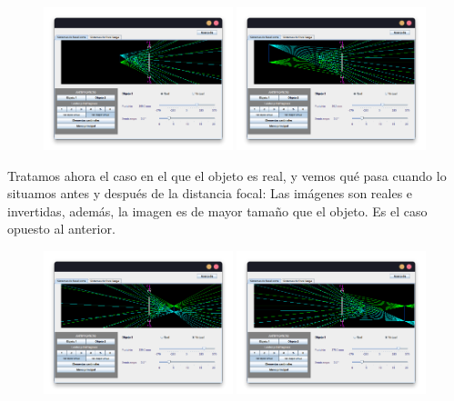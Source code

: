 \documentclass[11pt]{article}
\begin{document}
        \begin{figure}[ht]
            \centering
            \includegraphics[width=0.49\textwidth]{fotos/parte 1/Lentes Divergentes/Cuestión Propuesta/1.3.Real.Antes.png}
            \includegraphics[width=0.49\textwidth]{fotos/parte 1/Lentes Divergentes/Cuestión Propuesta/1.3.Real.Despues.png}
        \end{figure}

        \noindent Tratamos ahora el caso en el que el objeto es real, y vemos qué pasa cuando lo situamos antes y después de la distancia focal: Las imágenes son reales e invertidas, además, la imagen es de mayor tamaño que el objeto. Es el caso opuesto al anterior.

        \begin{figure}[ht]
            \centering
            \includegraphics[width=0.49\textwidth]{fotos/parte 1/Lentes Divergentes/Cuestión Propuesta/1.3.Virtual.Antes.png}
            \includegraphics[width=0.49\textwidth]{fotos/parte 1/Lentes Divergentes/Cuestión Propuesta/1.3.Virtual.Despues.png}
        \end{figure}
\end{document}
